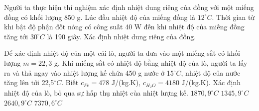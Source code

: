 \begin{vidu}
	Người ta thực hiện thí nghiệm xác định nhiệt dung riêng của đồng với một miếng đồng có khối lượng 850 g. Lúc đầu nhiệt độ của miếng đồng là $12^\circ C$. Thời gian từ khi bật độ phận đốt nóng có công suất 40 W đến khi nhiệt độ của miếng đồng tăng tới $30^\circ C$ là 190 giây. Xác định nhiệt dung riêng của đồng.
	\loigiai{
		\begin{itemize}
			\item 
			\item 
			\item 
			\item 
			\item 
			\item 
		\end{itemize}
	}
\end{vidu}
\begin{vidu}%
	Để xác định nhiệt độ của một cái lò, người ta đưa vào một miếng sắt có khối lượng $m=22,3$ g. Khi miếng sắt có nhiệt độ bằng nhiệt độ của lò, người ta lấy ra và thả ngay vào nhiệt lượng kế chứa 450 g nước ở 15$^{\circ}C$, nhiệt độ của nước tăng lên tới 22,5$^{\circ}C$. Biết $c_{Fe}=478$ J/(kg.K), $c_{H_2O}=4180$ J/(kg.K). Xác định nhiệt độ của lò, bỏ qua sự hấp thụ nhiệt của nhiệt lượng kế.
	\choice
	{$1870,9^{\circ}C$}
	{\True $1345,9^{\circ}C$}
	{$2640,9^{\circ}C$}
	{$7370,6^{\circ}C$}
\end{vidu}
